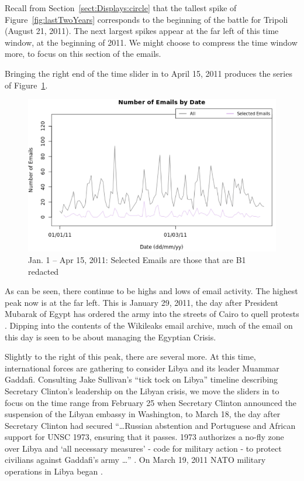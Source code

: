 \documentclass[journal]{vgtc}                %
\begin{document}
Recall from Section~\ref{sect:Displays:circle} that the tallest spike of Figure~\ref{fig:lastTwoYears} corresponds to the beginning of the battle for Tripoli (August 21, 2011).   The next largest spikes appear at the far left of this time window, at the beginning of 2011.  We might choose to compress the time window more, to focus on this section of the emails.

Bringing the right end of the time slider in to April 15, 2011 produces the series of Figure~\ref{fig:early2011B1}.
\begin{figure}[h]
\begin{center}
\includegraphics[width=0.95\linewidth]{EmailVolumeB1JanApril2011}
\caption{Jan. 1 -- Apr 15, 2011:  Selected Emails are those that are B1 redacted}
\label{fig:early2011B1}
\end{center}
\end{figure}
As can be seen, there continue to be highs and lows of email activity.   The highest peak now is at the far left.  This is January 29, 2011, the day after President Mubarak of Egypt has ordered the army into the streets of Cairo to quell protests \cite{cairoTanks2011, cairoResponse2011}.  Dipping into the contents of the Wikileaks email archive, much of the email on this day is seen to be about managing the Egyptian Crisis.  

Slightly to the right of this peak, there are several more.   At this time, international forces are gathering to consider Libya and its leader Muammar Gaddafi.  Consulting Jake Sullivan's ``tick tock on Libya'' timeline describing Secretary Clinton's leadership on the Libyan crisis, we move the sliders in to focus on the time range from February 25 when Secretary Clinton announced the suspension of the Libyan embassy in Washington, to March 18, the day after Secretary Clinton had secured ``\ldots Russian abstention and Portuguese and African support for UNSC 1973, ensuring that  it passes. 1973 authorizes a no-fly zone over Libya and `all necessary measures' - code for military action - to protect civilians against Gaddafi's army \ldots'' \cite{tickTockLibya}.  On March 19, 2011 NATO military operations in Libya began \cite{LibyaTimelineWiki}.
\end{document}
